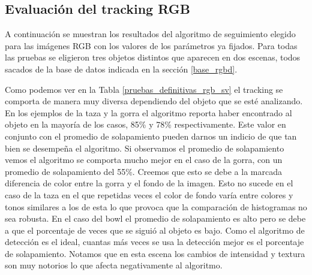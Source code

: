 \subsection{Evaluación del tracking RGB}\label{eval_rgb}
A continuación se muestran los resultados del algoritmo de seguimiento elegido para las imágenes RGB con los valores de los parámetros ya fijados. Para todas las pruebas se eligieron tres objetos distintos que aparecen en dos escenas, todos sacados de la base de datos indicada en la sección \ref{base_rgbd}.

Como podemos ver en la Tabla \ref{pruebas_definitivas_rgb_sv} el tracking se comporta de manera muy diversa dependiendo del objeto que se esté analizando. En los ejemplos de la taza y la gorra el algoritmo reporta haber encontrado al objeto en la mayoría de los casos, 85\% y 78\% respectivamente. Este valor en conjunto con el promedio de solapamiento pueden darnos un indicio de que tan bien se desempeña el algoritmo. Si observamos el promedio de solapamiento vemos el algoritmo se comporta mucho mejor en el caso de la gorra, con un promedio de solapamiento del 55\%. Creemos que esto se debe a la marcada diferencia de color entre la gorra y el fondo de la imagen. Esto no sucede en el caso de la taza en el que repetidas veces el color de fondo varía entre colores y tonos similares a los de esta lo que provoca que la comparación de histogramas no sea robusta. En el caso del bowl el promedio de solapamiento es alto pero se debe a que el porcentaje de veces que se siguió al objeto es bajo. Como el algoritmo de detección es el ideal, cuantas más veces se usa la detección mejor es el porcentaje de solapamiento. Notamos que en esta escena los cambios de intensidad y textura son muy notorios lo que afecta negativamente al algoritmo.


